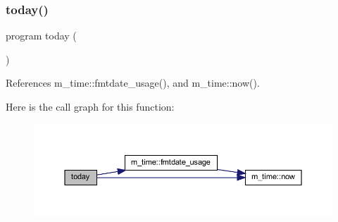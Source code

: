 \subsubsection{\texorpdfstring{today()}{today()}}
{\footnotesize\ttfamily program today (\begin{DoxyParamCaption}{ }\end{DoxyParamCaption})}



References m\+\_\+time\+::fmtdate\+\_\+usage(), and m\+\_\+time\+::now().

Here is the call graph for this function\+:
\nopagebreak
\begin{figure}[H]
\begin{center}
\leavevmode
\includegraphics[width=350pt]{today_8f90_a85de40d003821f9db87243b8b25b8d40_cgraph}
\end{center}
\end{figure}
